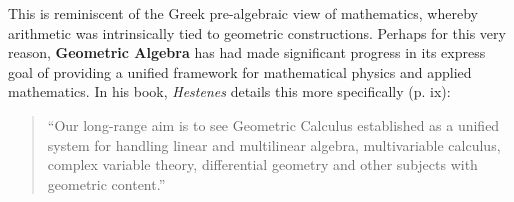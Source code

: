 This is reminiscent of the Greek pre-algebraic view of mathematics, whereby arithmetic was intrinsically tied to geometric constructions.
Perhaps for this very reason, \textbf{Geometric Algebra} has had made significant progress in its express goal of providing a unified framework for mathematical physics and applied mathematics. In his book, \textit{Hestenes} details this more specifically (p. ix)\cite{ga-origin}:

\begin{quote}
	``Our long-range aim is to see Geometric Calculus established as a unified system for handling linear and multilinear algebra, multivariable calculus, complex variable theory, differential geometry and other subjects with geometric content.''
\end{quote}

